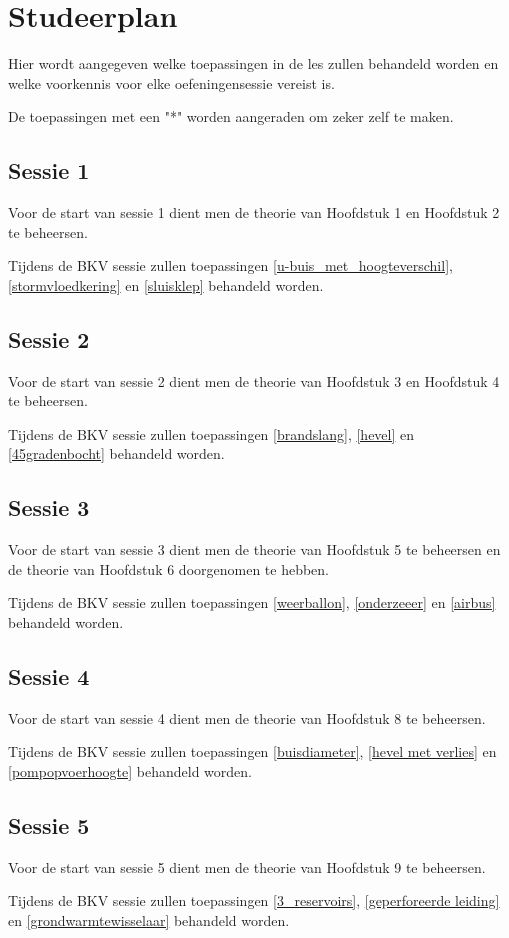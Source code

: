 \chapter{Studeerplan}
Hier wordt aangegeven welke toepassingen in de les zullen behandeld worden en welke voorkennis voor elke oefeningensessie vereist is.

De toepassingen met een "*" worden aangeraden om zeker zelf te maken.
	\section*{Sessie 1}
Voor de start van sessie 1 dient men de theorie van Hoofdstuk 1 en Hoofdstuk 2 te beheersen.

Tijdens de BKV sessie zullen toepassingen \ref{u-buis_met_hoogteverschil}, \ref{stormvloedkering} en \ref{sluisklep} behandeld worden.
	
	\section*{Sessie 2}
Voor de start van sessie 2 dient men de theorie van Hoofdstuk 3 en Hoofdstuk 4 te beheersen.

Tijdens de BKV sessie zullen toepassingen \ref{brandslang}, \ref{hevel} en \ref{45gradenbocht} behandeld worden.

	\section*{Sessie 3}
Voor de start van sessie 3 dient men de theorie van Hoofdstuk 5 te beheersen en de theorie van Hoofdstuk 6 doorgenomen te hebben.

Tijdens de BKV sessie zullen toepassingen \ref{weerballon}, \ref{onderzeeer} en \ref{airbus} behandeld worden.

	\section*{Sessie 4}
Voor de start van sessie 4 dient men de theorie van Hoofdstuk 8 te beheersen.

Tijdens de BKV sessie zullen toepassingen \ref{buisdiameter}, \ref{hevel met verlies} en \ref{pompopvoerhoogte} behandeld worden.
	
	\section*{Sessie 5}
Voor de start van sessie 5 dient men de theorie van Hoofdstuk 9 te beheersen.

Tijdens de BKV sessie zullen toepassingen \ref{3_reservoirs}, \ref{geperforeerde leiding} en \ref{grondwarmtewisselaar} behandeld worden.